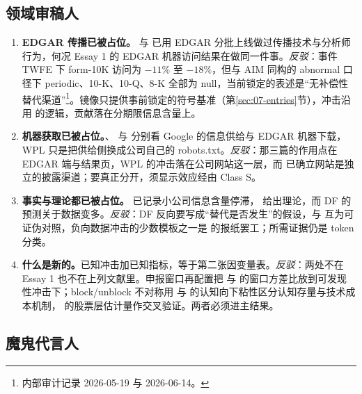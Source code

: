 \documentclass[a4paper,11pt]{ctexart}
\begin{document}
\subsection{领域审稿人}\label{sec:12-domain}

\begin{enumerate}[label=D\arabic*., leftmargin=*, itemsep=4pt]
\item \textbf{EDGAR 传播已被占位。}\citet{gaohuang2020} 与 \citet{changljungqvisttseng2023} 已用 EDGAR 分批上线做过传播技术与分析师行为，何况 Essay 1 的 EDGAR 机器访问结果在做同一件事。\emph{反驳}：事件 TWFE 下 form-10K 访问为 $-11\%$ 至 $-18\%$，但与 AIM 同构的 abnormal 口径下 periodic、10-K、10-Q、8-K 全部为 null，当前锁定的表述是“无补偿性替代渠道”\footnote{内部审计记录 2026-05-19 与 2026-06-14。}。镜像只提供事前锁定的符号基准（第\ref{sec:07-entries}节），冲击沿用 \citet{engelbergparsons2011} 的逻辑，贡献落在分期限信息含量上。

\item \textbf{机器获取已被占位。}\citet{stice2023}、\citet{jager2020} 与 \citet{pungaliyawang2022} 分别看 Google 的信息供给与 EDGAR 机器下载，WPL 只是把供给侧换成公司自己的 robots.txt。\emph{反驳}：那三篇的作用点在 EDGAR 端与结果页，WPL 的冲击落在公司网站这一层，而 \citet{boullandbourveaubreuer2026} 已确立网站是独立的披露渠道；要真正分开，须显示效应经由 Class S。

\item \textbf{事实与理论都已被占位。}\citet{farboodietal2022} 已记录小公司信息含量停滞，\citet{dugastfoucault2018,dugastfoucault2025} 给出理论，而 DF 的预测关于数据变多。\emph{反驳}：DF 反向要写成“替代是否发生”的假设，与 \citet{grossmanstiglitz1980} 互为可证伪对照，负向数据冲击的少数模板之一是 \citet{peress2014} 的报纸罢工；所需证据仍是 token 分类。

\item \textbf{什么是新的。}已知冲击加已知指标，等于第二张因变量表。\emph{反驳}：两处不在 Essay 1 也不在上列文献里。申报窗口再配置把 \citet{beaver1968} 与 \citet{liramesh2009} 的窗口方差比放到可发现性冲击下；block/unblock 不对称用 \citet{chennoronhasingal2004} 与 \citet{merton1987} 的认知向下粘性区分认知存量与技术成本机制，\citet{davilaparlatore2026} 的股票层估计量作交叉验证。两者必须进主结果。
\end{enumerate}

\subsection{魔鬼代言人}\label{sec:12-devil}
\end{document}
